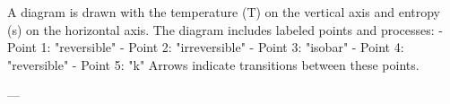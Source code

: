 A diagram is drawn with the temperature (T) on the vertical axis and entropy (s) on the horizontal axis. The diagram includes labeled points and processes:  
- Point 1: "reversible"  
- Point 2: "irreversible"  
- Point 3: "isobar"  
- Point 4: "reversible"  
- Point 5: "k"  
Arrows indicate transitions between these points.

---
